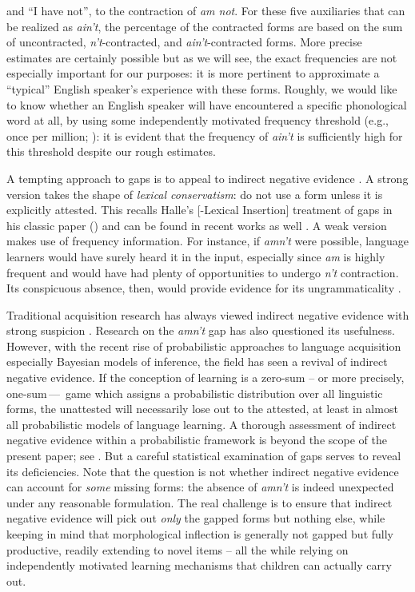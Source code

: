 \documentclass[output=paper,
modfonts
]{LSP/langsci}
\begin{document}
and ``I have not'', to the
contraction of \textit{am not}.
For these five auxiliaries that can be realized as \textit{ain't}, the
percentage of the contracted  forms are based on the sum of
uncontracted, \textit{n't}-contracted, and 
\textit{ain't}-contracted forms. More precise  estimates are
certainly possible but as  we will see, the exact frequencies are not
especially important for our 
purposes: it is more pertinent to approximate a ``typical'' English
speaker's experience with these forms. Roughly, we would like to know
whether an English speaker will have encountered a specific
phonological word at all, by using some independently motivated
frequency threshold (e.g., once per million; \citealt{Nagy1984}): it is evident
that the frequency of \textit{ain't} is sufficiently high  for this
threshold  despite our rough estimates. 


A tempting approach to gaps is to appeal to indirect negative evidence
\citep{LGB, Pinker1989}. A strong version takes the shape of \textit{lexical conservatism}: do not use a form unless it is explicitly
attested. This recalls Halle's [-Lexical Insertion] treatment of gaps 
in his classic paper (\citeyear{Halle1973a}) and can be found in recent
works as well \citep[e.g.,][]{Pertsova2005, Steriade1997, Rice2005b, Wolf2009}. A
weak version makes use of frequency information. For instance, if \textit{amn't} were  possible, language learners would have surely 
heard it in the input, especially since \textit{am} is highly
frequent and would have had plenty of opportunities to undergo \textit{n't} contraction. Its  conspicuous absence, then, would  provide
evidence for its 
ungrammaticality \citep[e.g.,][]{Daland2007, Sims2006, Baerman2008,
  Albright2009b}. 

Traditional acquisition research has always viewed indirect negative
evidence with strong suspicion 
\citep{Berwick1985, Osherson1986, 
  Pinker1989}. Research on the \textit{amn't} gap \citep[e.g.][]{Hudson2000} has also
questioned its usefulness. However, with the recent rise of probabilistic
approaches to language acquisition especially  Bayesian
models of inference,  the field has seen a revival of indirect negative evidence.
If the conception of learning is a zero-sum -- or more
precisely,  one-sum\,---\ game which  assigns a
probabilistic distribution over all linguistic forms,  the unattested will
necessarily lose out to the  attested, at least in almost all
probabilistic models of language learning. 
 A thorough assessment of indirect negative evidence within a
 probabilistic framework 
is beyond the scope of the present
paper; see \citealt{Niyogi2006, Yang2015aa, Yang2017}. But 
a careful statistical examination of gaps serves to 
reveal its deficiencies.   Note that the  question is not whether
indirect negative  
evidence can account for \textit{some} missing forms: 
the absence of \textit{amn't} is indeed unexpected under any reasonable
formulation. The real challenge is to
ensure that indirect negative evidence will pick out \textit{only} the
gapped forms but nothing else, while keeping in mind that 
morphological inflection is generally not gapped but fully
productive, readily extending to novel items -- all the while
relying on independently motivated learning mechanisms that children
can actually carry out.
\end{document}
